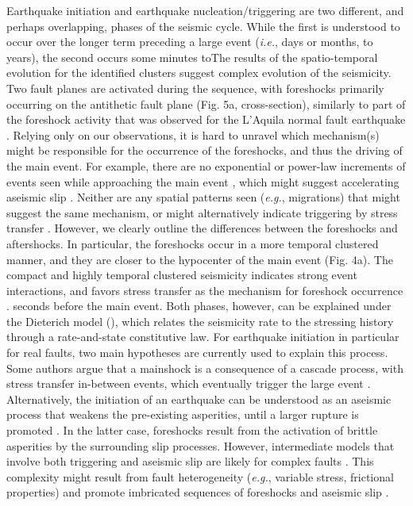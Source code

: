 \documentclass[a4paper,12pt,twoside]{article}
\begin{document}
Earthquake initiation \citep[\emph{e.g.}][]{Kato_2012_PSS, Schurr_2014_GUP, Tramutoli_2015_VCR} and earthquake nucleation/triggering \citep[\emph{e.g.}][]{Dieterich_1992_ENF, Ellsworth_1995_SEE, Rubin_2005_ENR} are two different, and perhaps overlapping, phases of the seismic cycle. While the first is understood to occur over the longer term preceding a large event (\emph{i.e.}, days or months, to years), the second occurs some minutes toThe results of the spatio-temporal evolution for the identified clusters suggest complex evolution of the seismicity. Two fault planes are activated during the sequence, with foreshocks primarily occurring on the antithetic fault plane (Fig. 5a, cross-section), similarly to part of the foreshock activity that was observed for the L'Aquila normal fault earthquake \citep{Chiaraluce_2011_AAN}. Relying only on our observations, it is hard to unravel which mechanism(s) might be responsible for the occurrence of the foreshocks, and thus the driving of the main event. For example, there are no exponential or power-law increments of events seen while approaching the main event \citep{Papazachos_1975_FEP,Kagan_1978_SSO}, which might suggest accelerating aseismic slip \citep{Dodge_1996_DOC, Bouchon_2011_ENI, Tape_2018_ENF}. Neither are any spatial patterns seen (\emph{e.g.}, migrations) that might suggest the same mechanism, or might alternatively indicate triggering by stress transfer \citep{Dodge_1996_DOC, Ellsworth_2018_NIE, Yoon_2019_FMN}. However, we clearly outline the differences between the foreshocks and aftershocks. In particular, the foreshocks occur in a more temporal clustered manner, and they are closer to the hypocenter of the main event (Fig. 4a). The compact and highly temporal clustered seismicity indicates strong event interactions, and favors stress transfer as the mechanism for foreshock occurrence \citep[COV,][]{Schoenball_2017_SAS}.
 seconds before the main event. Both phases, however, can be explained under the Dieterich model (\citeyear{Dieterich_1994_CLR}), which relates the seismicity rate to the stressing history through a rate-and-state constitutive law. For earthquake initiation in particular for real faults, two main hypotheses are currently used to explain this process. Some authors argue that a mainshock is a consequence of a cascade process, with stress transfer in-between events, which eventually trigger the large event \citep[\emph{e.g.},][]{Dodge_1996_DOC, Ellsworth_2018_NIE, Yoon_2019_FMN}. Alternatively, the initiation of an earthquake can be understood as an aseismic process that weakens the pre-existing asperities, until a larger rupture is promoted \citep{Dodge_1996_DOC, Bouchon_2011_ENI, Tape_2018_ENF}. In the latter case, foreshocks result from the activation of brittle asperities by the surrounding slip processes. However, intermediate models that involve both triggering and aseismic slip are likely for complex faults \citep[\emph{e.g.}][]{mclaskey2019earthquake}. This complexity might result from fault heterogeneity (\emph{e.g.}, variable stress, frictional properties) and promote imbricated sequences of foreshocks and aseismic slip \citep[\emph{e.g.},][]{dublanchet2018dynamics}.
\end{document}
